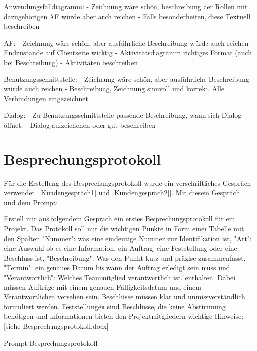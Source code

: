     Anwendungsfalldiagramm:
    - Zeichnung wäre schön, beschreibung der Rollen mit dazugehörigen AF würde aber auch reichen
    - Falls besonderheiten, diese Textuell beschreiben

    AF:
    - Zeichnung wäre schön, aber ausführliche Beschreibung würde auch reichen
    - Endzustände auf Clientseite wichtig
    - Aktivitätsdiagramm richtiges Format (auch bei Beschreibung)
    - Aktivitäten beschreiben

    Benutzungsschnittstelle:
    - Zeichnung wäre schön, aber ausführliche Beschreibung würde auch reichen
    - Beschreibung, Zeichnung sinnvoll und korrekt. Alle Verbindungen eingezeichnet

    Dialog:
    - Zu Benutzungsschnittstelle passende Beschreibung, wann sich Dialog öffnet.
    - Dialog aufzeichenen oder gut beschreiben


\section{Besprechungsprotokoll}  \label{CompBesprechungsprotokoll}

Für die Erstellung des Besprechungsprotokoll wurde ein verschriftliches Gespräch verwendet [\autoref{Kundengespräch1} 
und \autoref{Kundengespräch2}]. Mit diesem Gespräch und dem Prompt:
    
\begin{prompt}[H]
    \begin{tcolorbox}[colback=gray!20, colframe=gray!20, boxrule=0pt, sharp corners] 
        Erstell mir aus folgendem Gespräch ein erstes Besprechungsprotokoll für ein Projekt. Das Protokoll soll nur 
        die wichtigen Punkte in Form einer Tabelle mit den Spalten "Nummer": was eine eindeutige Nummer zur 
        Identifikation ist, "Art": eine Auswahl ob es eine Information, ein Auftrag, eine Feststellung oder eine 
        Beschluss ist, "Beschreibung": Was den Punkt kurz und präzise zusammenfasst, "Termin": ein genaues Datum bis 
        wann der Auftrag erledigt sein muss und "Verantwortlich": Welches Teammitglied verantwortlich ist, enthalten. 
        Dabei müssen Aufträge mit einem genauen Fälligkeitsdatum und einem Verantwortlichen versehen sein. Beschlüsse 
        müssen klar und unmissverständlich formuliert werden. Feststellungen sind Beschlüsse, die keine Abstimmung 
        benötigen und Informationen bieten den Projektmitgliedern wichtige Hinweise: 
        [siehe Besprechungsprotokoll.docx]
        \vfill
    \end{tcolorbox}
    \caption{Prompt Besprechungsprotokoll}
    \label{Prompt Besprechungsprotokoll}
\end{prompt}

